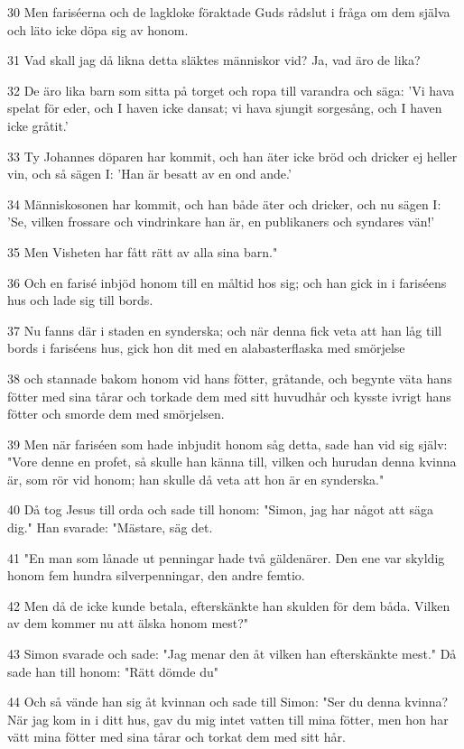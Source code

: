 \par 30 Men fariséerna och de lagkloke föraktade Guds rådslut i fråga om dem själva och läto icke döpa sig av honom.
\par 31 Vad skall jag då likna detta släktes människor vid? Ja, vad äro de lika?
\par 32 De äro lika barn som sitta på torget och ropa till varandra och säga: 'Vi hava spelat för eder, och I haven icke dansat; vi hava sjungit sorgesång, och I haven icke gråtit.'
\par 33 Ty Johannes döparen har kommit, och han äter icke bröd och dricker ej heller vin, och så sägen I: 'Han är besatt av en ond ande.'
\par 34 Människosonen har kommit, och han både äter och dricker, och nu sägen I: 'Se, vilken frossare och vindrinkare han är, en publikaners och syndares vän!'
\par 35 Men Visheten har fått rätt av alla sina barn."
\par 36 Och en farisé inbjöd honom till en måltid hos sig; och han gick in i fariséens hus och lade sig till bords.
\par 37 Nu fanns där i staden en synderska; och när denna fick veta att han låg till bords i fariséens hus, gick hon dit med en alabasterflaska med smörjelse
\par 38 och stannade bakom honom vid hans fötter, gråtande, och begynte väta hans fötter med sina tårar och torkade dem med sitt huvudhår och kysste ivrigt hans fötter och smorde dem med smörjelsen.
\par 39 Men när fariséen som hade inbjudit honom såg detta, sade han vid sig själv: "Vore denne en profet, så skulle han känna till, vilken och hurudan denna kvinna är, som rör vid honom; han skulle då veta att hon är en synderska."
\par 40 Då tog Jesus till orda och sade till honom: "Simon, jag har något att säga dig." Han svarade: "Mästare, säg det.
\par 41 "En man som lånade ut penningar hade två gäldenärer. Den ene var skyldig honom fem hundra silverpenningar, den andre femtio.
\par 42 Men då de icke kunde betala, efterskänkte han skulden för dem båda. Vilken av dem kommer nu att älska honom mest?"
\par 43 Simon svarade och sade: "Jag menar den åt vilken han efterskänkte mest." Då sade han till honom: "Rätt dömde du"
\par 44 Och så vände han sig åt kvinnan och sade till Simon: "Ser du denna kvinna? När jag kom in i ditt hus, gav du mig intet vatten till mina fötter, men hon har vätt mina fötter med sina tårar och torkat dem med sitt hår.
